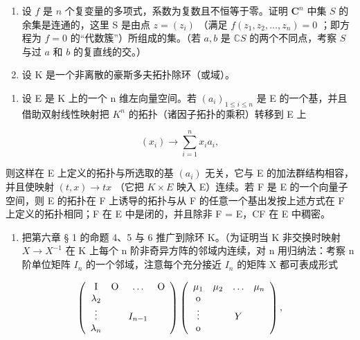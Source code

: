 \ExerciseSection

\begin{enumerate}
\def\labelenumi{\arabic{enumi})}
\item
  设 \(f\) 是 \(n\) 个复变量的多项式，系数为复数且不恒等于零。证明 \(\mathbf{C}^n\) 中集 \(S\) 的余集是连通的，这里 S 是由点 \(z = (z_i)\) （满足 \(f(z_1, z_2, \ldots, z_n) = 0\) ；即方程为 \(f = 0\) 的“代数簇”）所组成的集。（若 \(a, b\) 是 \(\mathbb{C}S\) 的两个不同点，考察 \(S\) 与过 \(a\) 和 \(b\) 的复直线的交。）
\item
  设 K 是一个非离散的豪斯多夫拓扑除环（或域）。
\end{enumerate}

\begin{enumerate}
\def\labelenumi{\alph{enumi})}
\tightlist
\item
  设 E 是 K 上的一个 n 维左向量空间。若 \((a_{i})_{1\leqslant i\leqslant n}\) 是 E 的一个基，并且借助双射线性映射把 \(K^{n}\) 的拓扑（诸因子拓扑的乘积）转移到 E 上
\end{enumerate}

\[
(x _ {i}) \rightarrow \sum_ {i = 1} ^ {n} x _ {i} a _ {i},
\]

则这样在 E 上定义的拓扑与所选取的基 \((a_{i})\) 无关，它与 E 的加法群结构相容，并且使映射 \((t, x) \to tx\) （它把 \(K \times E\) 映入 E）连续。若 F 是 E 的一个向量子空间，则 E 的拓扑在 F 上诱导的拓扑与从 F 的任意一个基出发按上述方式在 F 上定义的拓扑相同；F 在 E 中是闭的，并且除非 F = E，CF 在 E 中稠密。

\begin{enumerate}
\def\labelenumi{\alph{enumi})}
\setcounter{enumi}{1}
\tightlist
\item
  把第六章 § 1 的命题 4、5 与 6 推广到除环 K。（为证明当 K 非交换时映射 \(X \to X^{-1}\) 在 K 上每个 n 阶非奇异方阵的邻域内连续，对 n 用归纳法：考察 n 阶单位矩阵 \(I_{n}\) 的一个邻域，注意每个充分接近 \(I_{n}\) 的矩阵 X 都可表成形式
\end{enumerate}

\[
\left( \begin{array}{c c c c} \mathrm{I} & \mathrm{O} & \ldots & \mathrm{O} \\ \lambda_ {2} & & & \\ \vdots & & I _ {n - 1} & \\ \lambda_ {n} & & & \end{array} \right) \left( \begin{array}{c c c c} \mu_ {1} & \mu_ {2} & \ldots & \mu_ {n} \\ \mathrm{o} & & & \\ \vdots & & Y & \\ \mathrm{o} & & & \end{array} \right),
\]

